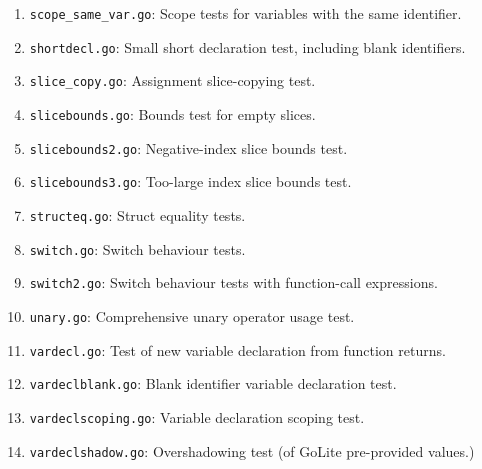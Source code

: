 \documentclass[11pt]{article}
\begin{document}
\begin{enumerate}
\item \texttt{scope\_same\_var.go}: Scope tests for variables with the same identifier.
\item \texttt{shortdecl.go}: Small short declaration test, including blank identifiers.
\item \texttt{slice\_copy.go}: Assignment slice-copying test.
\item \texttt{slicebounds.go}: Bounds test for empty slices.
\item \texttt{slicebounds2.go}: Negative-index slice bounds test.
\item \texttt{slicebounds3.go}: Too-large index slice bounds test.
\item \texttt{structeq.go}: Struct equality tests.
\item \texttt{switch.go}: Switch behaviour tests.
\item \texttt{switch2.go}: Switch behaviour tests with function-call expressions.
\item \texttt{unary.go}: Comprehensive unary operator usage test.
\item \texttt{vardecl.go}: Test of new variable declaration from function returns.
\item \texttt{vardeclblank.go}: Blank identifier variable declaration test.
\item \texttt{vardeclscoping.go}: Variable declaration scoping test.
\item \texttt{vardeclshadow.go}: Overshadowing test (of GoLite pre-provided values.)
\end{enumerate}
\end{document}
